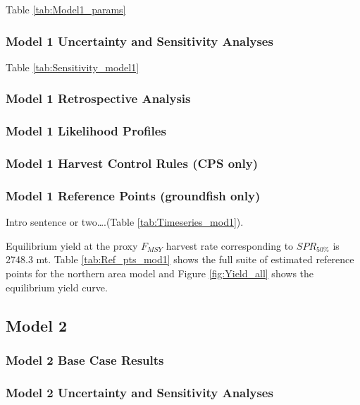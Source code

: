 \documentclass[12pt,]{article}
\begin{document}
Table \ref{tab:Model1_params}

\subsubsection{Model 1 Uncertainty and Sensitivity
Analyses}\label{model-1-uncertainty-and-sensitivity-analyses}

Table \ref{tab:Sensitivity_model1}

\subsubsection{Model 1 Retrospective
Analysis}\label{model-1-retrospective-analysis}

\subsubsection{Model 1 Likelihood
Profiles}\label{model-1-likelihood-profiles}

\subsubsection{Model 1 Harvest Control Rules (CPS
only)}\label{model-1-harvest-control-rules-cps-only}

\subsubsection{Model 1 Reference Points (groundfish
only)}\label{model-1-reference-points-groundfish-only}

Intro sentence or two\ldots{}.(Table \ref{tab:Timeseries_mod1}).

Equilibrium yield at the proxy \(F_{MSY}\) harvest rate corresponding to
\(SPR_{50\%}\) is 2748.3 mt. Table \ref{tab:Ref_pts_mod1} shows the full
suite of estimated reference points for the northern area model and
Figure \ref{fig:Yield_all} shows the equilibrium yield curve.

\subsection{Model 2}\label{model-2}

\subsubsection{Model 2 Base Case
Results}\label{model-2-base-case-results}

\subsubsection{Model 2 Uncertainty and Sensitivity
Analyses}\label{model-2-uncertainty-and-sensitivity-analyses}
\end{document}
